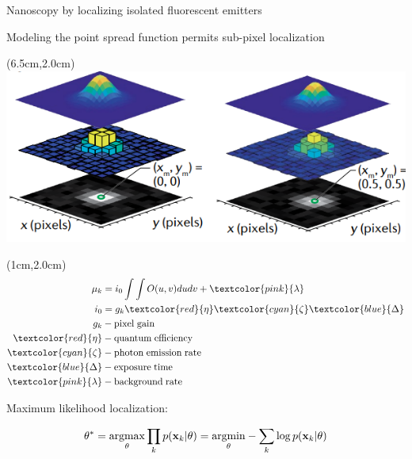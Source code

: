 \documentclass{beamer}					%
\begin{document}



\begin{frame}{Nanoscopy by localizing isolated fluorescent emitters}

Modeling the point spread function permits sub-pixel localization 

\begin{textblock*}{8cm}(6.5cm,2.0cm)
\includegraphics[width=\textwidth]{../../dissertation/dissertation/media/Model.png}
\end{textblock*}

\begin{textblock*}{2cm}(1cm,2.0cm)
\begin{align*}
\mu_{k} &= i_{0}\int\int O(u,v)dudv + \textcolor{pink}{\lambda}\\
i_{0} &= g_{k}\textcolor{red}{\eta} \textcolor{cyan}{\zeta}\textcolor{blue}{\Delta} 
\\
g_{k} &- \mathrm{pixel\; gain}\\
\textcolor{red}{\eta} &- \mathrm{quantum\; efficiency}\\
\textcolor{cyan}{\zeta} &- \mathrm{photon\; emission\; rate}\\
\textcolor{blue}{\Delta} &- \mathrm{exposure\; time}\\
\textcolor{pink}{\lambda} &- \mathrm{background \; rate}
\end{align*}
\end{textblock*}

\vspace{2in}

Maximum likelihood localization:

\begin{equation*}
\theta^{*} = \underset{\theta}{\mathrm{argmax}}\prod_{k}p(\bold{x}_{k}|\theta)= \underset{\theta}{\mathrm{argmin}}-\sum_{k}\log p(\bold{x}_{k}|\theta)
\end{equation*}

\end{frame}
\end{document}
